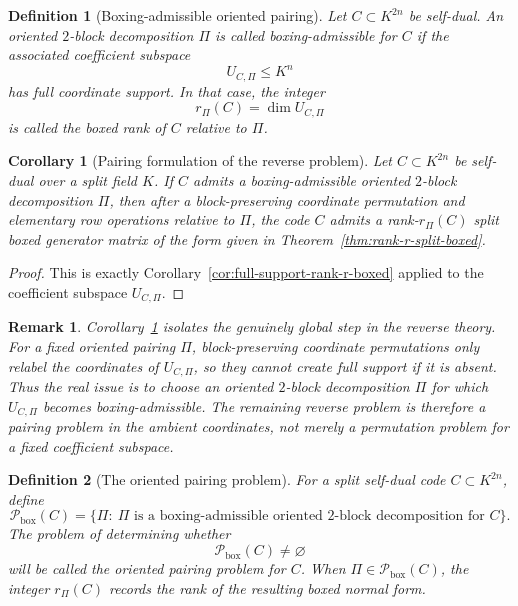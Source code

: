 \documentclass[12pt]{article}
\newtheorem{defn}{Definition}[section]
\newtheorem{cor}[theorem]{Corollary}
\newtheorem{remark}[theorem]{Remark}
\begin{document}
\begin{defn}[Boxing-admissible oriented pairing]
\label{def:boxing-admissible-pairing}
Let \(C\subset K^{2n}\) be self-dual. An oriented \(2\)-block decomposition \(\Pi\) is called \emph{boxing-admissible} for \(C\) if the associated coefficient subspace
\[
U_{C,\Pi}\le K^n
\]
has full coordinate support. In that case, the integer
\[
r_\Pi(C)=\dim U_{C,\Pi}
\]
is called the \emph{boxed rank of \(C\) relative to \(\Pi\)}.
\end{defn}

\begin{cor}[Pairing formulation of the reverse problem]
\label{cor:pairing-formulation}
Let \(C\subset K^{2n}\) be self-dual over a split field \(K\). If \(C\) admits a boxing-admissible oriented \(2\)-block decomposition \(\Pi\), then after a block-preserving coordinate permutation and elementary row operations relative to \(\Pi\), the code \(C\) admits a rank-\(r_\Pi(C)\) split boxed generator matrix of the form given in Theorem~\ref{thm:rank-r-split-boxed}.
\end{cor}

\begin{proof}
This is exactly Corollary~\ref{cor:full-support-rank-r-boxed} applied to the coefficient subspace \(U_{C,\Pi}\).
\end{proof}

\begin{remark}
\rm
Corollary~\ref{cor:pairing-formulation} isolates the genuinely global step in the reverse theory. For a \emph{fixed} oriented pairing \(\Pi\), block-preserving coordinate permutations only relabel the coordinates of \(U_{C,\Pi}\), so they cannot create full support if it is absent. Thus the real issue is to choose an oriented \(2\)-block decomposition \(\Pi\) for which \(U_{C,\Pi}\) becomes boxing-admissible. The remaining reverse problem is therefore a pairing problem in the ambient coordinates, not merely a permutation problem for a fixed coefficient subspace.
\end{remark}

\begin{defn}[The oriented pairing problem]
\label{def:oriented-pairing-problem}
For a split self-dual code \(C\subset K^{2n}\), define
\[
\mathcal P_{\mathrm{box}}(C)=
\bigl\{\Pi:\ \Pi \text{ is a boxing-admissible oriented 2-block decomposition for } C\bigr\}.
\]
The problem of determining whether
\[
\mathcal P_{\mathrm{box}}(C)\neq \varnothing
\]
will be called the \emph{oriented pairing problem} for \(C\). When \(\Pi\in \mathcal P_{\mathrm{box}}(C)\), the integer \(r_\Pi(C)\) records the rank of the resulting boxed normal form.
\end{defn}
\end{document}
